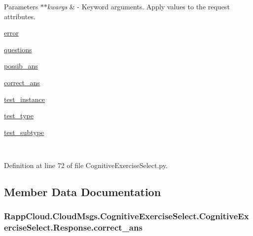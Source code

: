 \begin{DoxyParams}{Parameters}
{\em $\ast$$\ast$kwargs} & -\/ Keyword arguments. Apply values to the request attributes.
\begin{DoxyItemize}
\item \hyperlink{classRappCloud_1_1CloudMsgs_1_1CognitiveExerciseSelect_1_1CognitiveExerciseSelect_1_1Response_a4678c5adecdd6d068ac0a5d8db9f0eb4}{error}
\item \hyperlink{classRappCloud_1_1CloudMsgs_1_1CognitiveExerciseSelect_1_1CognitiveExerciseSelect_1_1Response_adefa61c1a4386dd3b190fb01755156a9}{questions}
\item \hyperlink{classRappCloud_1_1CloudMsgs_1_1CognitiveExerciseSelect_1_1CognitiveExerciseSelect_1_1Response_a961ae0ff8920eb42db94fdfb737fdb6f}{possib\-\_\-ans}
\item \hyperlink{classRappCloud_1_1CloudMsgs_1_1CognitiveExerciseSelect_1_1CognitiveExerciseSelect_1_1Response_a167281ca5ae7322e9f3cd521ae172da3}{correct\-\_\-ans}
\item \hyperlink{classRappCloud_1_1CloudMsgs_1_1CognitiveExerciseSelect_1_1CognitiveExerciseSelect_1_1Response_a9e978c59f4c6a3640bdb9cb88a0cf1be}{test\-\_\-instance}
\item \hyperlink{classRappCloud_1_1CloudMsgs_1_1CognitiveExerciseSelect_1_1CognitiveExerciseSelect_1_1Response_aeed0edf3b104e298ff51eaeb569cf337}{test\-\_\-type}
\item \hyperlink{classRappCloud_1_1CloudMsgs_1_1CognitiveExerciseSelect_1_1CognitiveExerciseSelect_1_1Response_a996889b085f87874685d0bf402eba5b4}{test\-\_\-subtype} 
\end{DoxyItemize}\\
\hline
\end{DoxyParams}


Definition at line 72 of file Cognitive\-Exercise\-Select.\-py.



\subsection{Member Data Documentation}
\hypertarget{classRappCloud_1_1CloudMsgs_1_1CognitiveExerciseSelect_1_1CognitiveExerciseSelect_1_1Response_a167281ca5ae7322e9f3cd521ae172da3}{
\subsubsection[{correct\-\_\-ans}]{\setlength{\rightskip}{0pt plus 5cm}Rapp\-Cloud.\-Cloud\-Msgs.\-Cognitive\-Exercise\-Select.\-Cognitive\-Exercise\-Select.\-Response.\-correct\-\_\-ans}}\label{classRappCloud_1_1CloudMsgs_1_1CognitiveExerciseSelect_1_1CognitiveExerciseSelect_1_1Response_a167281ca5ae7322e9f3cd521ae172da3}


